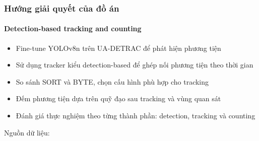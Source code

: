\begin{frame}
\frametitle{Hướng giải quyết của đồ án}
\framesubtitle{Detection-based tracking and counting}

\begin{itemize}[<+->]
  \item Fine-tune YOLOv8n trên UA-DETRAC để phát hiện phương tiện
  \item Sử dụng tracker kiểu detection-based để ghép nối phương tiện theo thời
        gian
  \item So sánh SORT và BYTE, chọn cấu hình phù hợp cho tracking
  \item Đếm phương tiện dựa trên quỹ đạo sau tracking và vùng quan sát
  \item Đánh giá thực nghiệm theo từng thành phần: detection, tracking và
        counting
\end{itemize}

\vspace{0.2cm}

{\scriptsize Nguồn dữ liệu: \cite{wen2020uadetrac}}

\end{frame}
